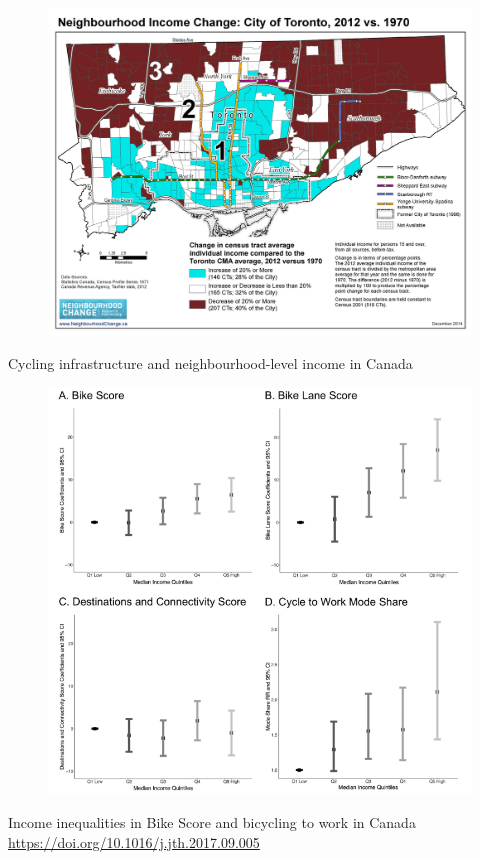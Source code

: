\documentclass[aspectratio=169]{beamer}
\begin{document}
\begin{frame}
	
	\begin{figure}
		\centering
		\includegraphics[width=0.84\linewidth]{images/3cities_2012_1970.jpeg}
	\end{figure}
	
\end{frame}




\begin{frame}
	
	Cycling infrastructure and neighbourhood-level income in Canada
	
	\begin{figure}
		\centering
		\includegraphics[width=0.6\linewidth]{images/bikescore_income.png}
	\end{figure}
	
	\tiny Income inequalities in Bike Score and bicycling to work in Canada \url{https://doi.org/10.1016/j.jth.2017.09.005}
	
\end{frame}
\end{document}
